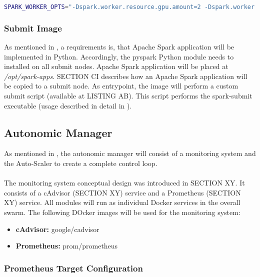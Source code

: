 \begin{lstlisting}[label=lst:06_computing_spark_worker-env, caption=Environment configuration for all worker nodes, language=bash]
SPARK_WORKER_OPTS="-Dspark.worker.resource.gpu.amount=2 -Dspark.worker.resource.gpu.discoveryScript=/opt/sparkRapidsPlugin/getGpusResources.sh"
\end{lstlisting}


\subsubsection{Submit Image}
As mentioned in , a requirements is, that Apache Spark application will be implemented in Python. Accordingly, the pyspark Python module needs to installed on all submit nodes.
Apache Spark application will be placed at \textit{/opt/spark-apps}. SECTION CI describes how an Apache Spark application will be copied to a submit node.
As entrypoint, the image will perform a custom submit script (available at LISTING AB). This script performs the spark-submit executable (usage described in detail in ).


\subsection{Autonomic Manager}
As mentioned in , the autonomic manager will consist of a monitoring system and the Auto-Scaler to create a complete control loop.

\paragraph{}The monitoring system conceptual design was introduced in SECTION XY.
It consists of a cAdvisor (SECTION XY) service and a Prometheus (SECTION XY) service.
All modules will run as individual Docker services in the overall swarm.
The following DOcker images will be used for the monitoring system:
\begin{itemize}
\item \textbf{cAdvisor:} google/cadvisor
\item \textbf{Prometheus:} prom/prometheus
\end{itemize}

\subsubsection{Prometheus Target Configuration}

